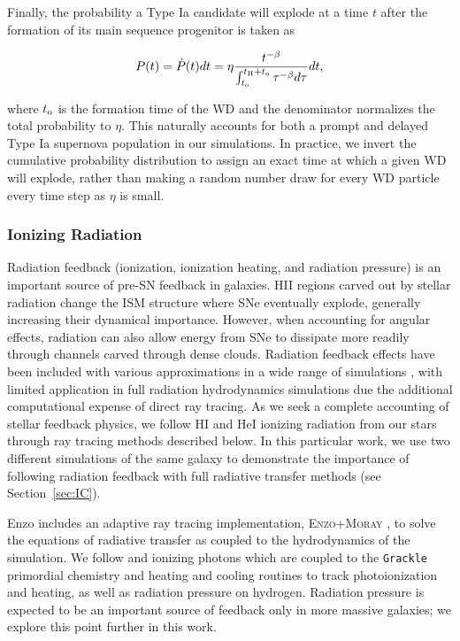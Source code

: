 \documentclass[twocolumn]{aastex61}
\begin{document}
Finally, the probability a Type Ia candidate will explode at a time $t$ after the formation of its main sequence progenitor is taken as

\begin{equation}
P(t) = \dot{P}(t)dt = \eta \frac{ t^{-\beta}}{ \int_{t_{\rm o}}^{t_{\rm H} + t_{\rm o}} \tau^{-\beta} d\tau} dt,
\end{equation}

where $t_{\rm o}$ is the formation time of the WD and the denominator normalizes the total probability to $\eta$. This naturally accounts for both a prompt and delayed Type Ia supernova population in our simulations.
In practice, we invert the cumulative probability distribution to assign an exact time at which a given WD will explode, rather than making a random number draw for every WD particle every time step as $\eta$ is small.

\subsubsection{Ionizing Radiation}
\label{sec:ionizing radiation}
Radiation feedback (ionization, ionization heating, and radiation pressure) is an important source of pre-SN feedback in galaxies. HII regions carved out by stellar radiation change the ISM structure where SNe eventually explode, generally increasing their dynamical importance. However, when accounting for angular effects, radiation can also allow energy from SNe to dissipate more readily through channels carved through dense clouds. Radiation feedback effects have been included with various approximations in a wide range of simulations \citep[e.g.][]{OppenheimerDave2006, Krumholz2007, HopkinsQuataertMurray2012, Agertz2013, Renaud2013, Stinson2013, Roskar2014, Ceverino2014, FIRE, AgertzKravtsov2015, Forbes2016, Hu2016, Hu2017, FIRE2}, with limited application in full radiation hydrodynamics simulations \citep{WiseAbel2012,Wise2012a,Wise2014,Kim2013a, Kim2013b,Pawlik2013,Rosdahl2015,Aubert2015,Ocvirk2016,BaczynskiGloverKlessen2015,Pawlik2017} due the additional computational expense of direct ray tracing. As we seek a complete accounting of stellar feedback physics, we follow HI and HeI ionizing radiation from our stars through ray tracing methods described below. In this particular work, we use two different simulations of the same galaxy to demonstrate the importance of following radiation feedback with full radiative transfer methods (see Section~\ref{sec:IC}). 

Enzo includes an adaptive ray tracing implementation, \textsc{Enzo+Moray} \citep{WiseAbel2011}, to solve the equations of radiative transfer as coupled to the hydrodynamics of the simulation. We follow  and  ionizing photons which are coupled to the \texttt{Grackle} primordial chemistry and heating and cooling routines to track photoionization and heating, as well as radiation pressure on hydrogen. Radiation pressure is expected to be an important source of feedback only in more massive galaxies; we explore this point further in this work.
\end{document}
